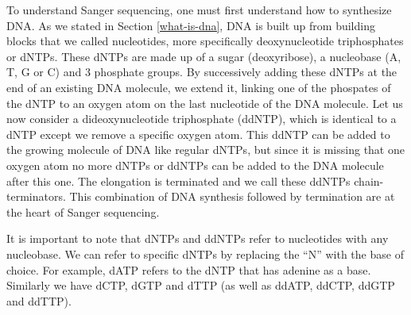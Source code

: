 \documentclass[
  11pt,
  twoside,
  BCOR=10mm,
  listof=totoc]{scrbook}
\begin{document}
To understand Sanger sequencing, one must first understand how to synthesize DNA. As we stated in Section \ref{what-is-dna}, DNA is built up from building blocks that we called nucleotides, more specifically deoxynucleotide triphosphates or dNTPs. These dNTPs are made up of a sugar (deoxyribose), a nucleobase (A, T, G or C) and 3 phosphate groups. By successively adding these dNTPs at the end of an existing DNA molecule, we extend it, linking one of the phospates of the dNTP to an oxygen atom on the last nucleotide of the DNA molecule. Let us now consider a dideoxynucleotide triphosphate (ddNTP), which is identical to a dNTP except we remove a specific oxygen atom. This ddNTP can be added to the growing molecule of DNA like regular dNTPs, but since it is missing that one oxygen atom no more dNTPs or ddNTPs can be added to the DNA molecule after this one. The elongation is terminated and we call these ddNTPs chain-terminators. This combination of DNA synthesis followed by termination are at the heart of Sanger sequencing.

It is important to note that dNTPs and ddNTPs refer to nucleotides with any nucleobase. We can refer to specific dNTPs by replacing the ``N'' with the base of choice. For example, dATP refers to the dNTP that has adenine as a base. Similarly we have dCTP, dGTP and dTTP (as well as ddATP, ddCTP, ddGTP and ddTTP).
\end{document}
